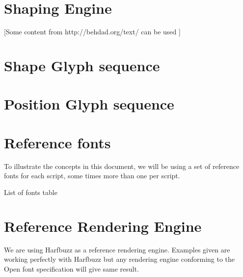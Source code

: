 \section{Shaping Engine}

[Some content from http://behdad.org/text/ can be used ]

\section{Shape Glyph sequence}

\section{Position Glyph sequence}

\section{Reference fonts}

To illustrate the concepts in this document, we will be using a set of
reference fonts for each script, some times more than one per script.

List of fonts table

\section{Reference Rendering Engine}

We are using Harfbuzz as a reference rendering engine. Examples given are
working perfectly with Harfbuzz but any rendering engine conforming to the
Open font specification will give same result.
